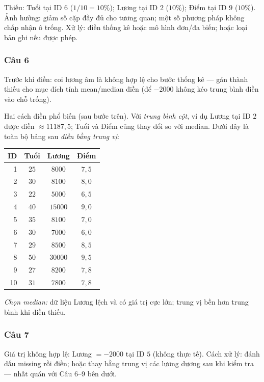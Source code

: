 Thiếu: Tuổi tại ID $6$ ($1/10=10\%$); Lương tại ID $2$ ($10\%$); Điểm tại ID $9$ ($10\%$). Ảnh hưởng: giảm số cặp đầy đủ cho tương quan; một số phương pháp không chấp nhận ô trống. Xử lý: điền thống kê hoặc mô hình đơn/đa biến; hoặc loại bản ghi nếu được phép.

\subsubsection*{Câu 6}

Trước khi điền: coi lương âm là không hợp lệ cho bước thống kê --- gán thành thiếu cho mục đích tính mean/median điền (để $-2000$ không kéo trung bình điền vào chỗ trống).

Hai cách điền phổ biến (sau bước trên). Với \emph{trung bình cột}, ví dụ Lương tại ID $2$ được điền $\approx11187{,}5$; Tuổi và Điểm cũng thay đổi so với median. Dưới đây là toàn bộ bảng sau \emph{điền bằng trung vị}:

\begin{center}
\small
\begin{tabular}{rccc}
ID & Tuổi & Lương & Điểm\\\hline
1 & $25$ & $8000$ & $7{,}5$ \\
2 & $30$ & $8100$ & $8{,}0$ \\
3 & $22$ & $5000$ & $6{,}5$ \\
4 & $40$ & $15000$ & $9{,}0$ \\
5 & $35$ & $8100$ & $7{,}0$ \\
6 & $30$ & $7000$ & $6{,}0$ \\
7 & $29$ & $8500$ & $8{,}5$ \\
8 & $50$ & $30000$ & $9{,}5$ \\
9 & $27$ & $8200$ & $7{,}8$ \\
10 & $31$ & $7800$ & $7{,}8$ \\
\end{tabular}
\end{center}

\emph{Chọn median:} dữ liệu Lương lệch và có giá trị cực lớn; trung vị bền hơn trung bình khi điền thiếu.

\subsubsection*{Câu 7}

Giá trị không hợp lệ: Lương $=-2000$ tại ID $5$ (không thực tế). Cách xử lý: đánh dấu missing rồi điền; hoặc thay bằng trung vị các lương dương sau khi kiểm tra --- nhất quán với Câu 6--9 bên dưới.

